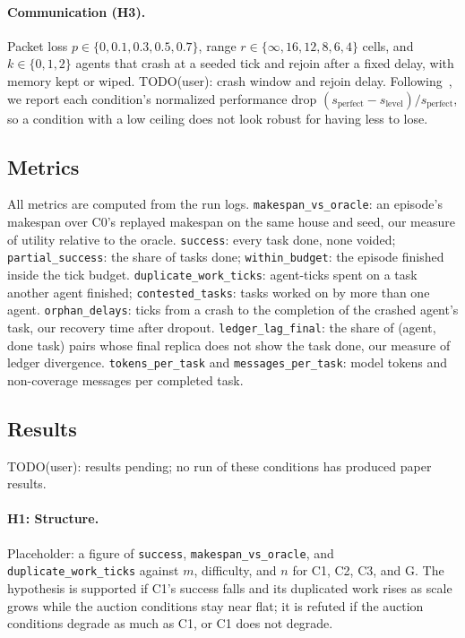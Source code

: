 \documentclass[letterpaper]{article}
\begin{document}
\paragraph{Communication (H3).}
Packet loss $p\in\{0,0.1,0.3,0.5,0.7\}$, range $r\in\{\infty,16,12,8,6,4\}$ cells, and $k\in\{0,1,2\}$ agents that crash at a seeded tick and rejoin after a fixed delay, with memory kept or wiped. TODO(user): crash window and rejoin delay. Following~\citet{bansal2026agentcomm}, we report each condition's normalized performance drop $(s_{\text{perfect}}-s_{\text{level}})/s_{\text{perfect}}$, so a condition with a low ceiling does not look robust for having less to lose.

\subsection{Metrics}

All metrics are computed from the run logs. \texttt{makespan\_vs\_oracle}: an episode's makespan over C0's replayed makespan on the same house and seed, our measure of utility relative to the oracle. \texttt{success}: every task done, none voided; \texttt{partial\_success}: the share of tasks done; \texttt{within\_budget}: the episode finished inside the tick budget. \texttt{duplicate\_work\_ticks}: agent-ticks spent on a task another agent finished; \texttt{contested\_tasks}: tasks worked on by more than one agent. \texttt{orphan\_delays}: ticks from a crash to the completion of the crashed agent's task, our recovery time after dropout. \texttt{ledger\_lag\_final}: the share of (agent, done task) pairs whose final replica does not show the task done, our measure of ledger divergence. \texttt{tokens\_per\_task} and \texttt{messages\_per\_task}: model tokens and non-coverage messages per completed task.

\subsection{Results}

TODO(user): results pending; no run of these conditions has produced paper results.

\paragraph{H1: Structure.}
Placeholder: a figure of \texttt{success}, \texttt{makespan\_vs\_oracle}, and \texttt{duplicate\_work\_ticks} against $m$, difficulty, and $n$ for C1, C2, C3, and G. The hypothesis is supported if C1's success falls and its duplicated work rises as scale grows while the auction conditions stay near flat; it is refuted if the auction conditions degrade as much as C1, or C1 does not degrade.
\end{document}
